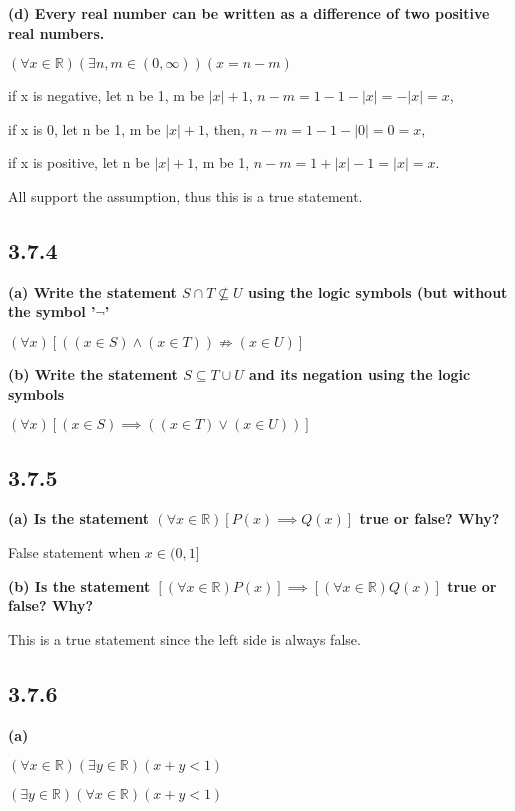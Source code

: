 \documentclass{article}
\begin{document}
\textbf{(d) Every real number can be written as a difference of two positive real numbers.}

\centerline{$(\forall x \in \mathbb{R})(\exists n, m \in (0,\infty ))(x=n-m)$}

if x is negative, let n be 1, m be $|x|+1$, $n-m=1-1-|x|=-|x|=x$,

if x is 0, let n be 1, m be $|x|+1$, then, $n-m=1-1-|0|=0=x$,

if x is positive, let n be $|x|+1$, m be 1, $n-m=1+|x|-1=|x|=x$.

All support the assumption, thus this is a true statement. 

\subsection*{3.7.4}

\textbf{(a) Write the statement $S\cap T\nsubseteq U$ using the logic symbols (but without the symbol '$\neg$'}

\centerline{$(\forall x)[((x \in S)\land (x \in T)) \nRightarrow (x \in U)]$}

\textbf{(b) Write the statement $S\subseteq T \cup U$ and its negation using the logic symbols}

\centerline{$(\forall x)[(x \in S)\implies ((x \in T)\lor(x \in U))]$}

\subsection*{3.7.5}

\textbf{(a) Is the statement $(\forall x \in \mathbb{R})[P(x)\implies Q(x)]$ true or false? Why?}

False statement when $x \in (0,1]$

\textbf{(b) Is the statement $[(\forall x \in \mathbb{R})P(x)]\implies [(\forall x \in \mathbb{R})Q(x)]$ true or false? Why?}

This is a true statement since the left side is always false. 

\subsection*{3.7.6}

\textbf{(a)}

$(\forall x \in \mathbb{R})(\exists y \in \mathbb{R})(x+y < 1)$

$(\exists y \in \mathbb{R})(\forall x \in \mathbb{R})(x+y<1)$
\end{document}
